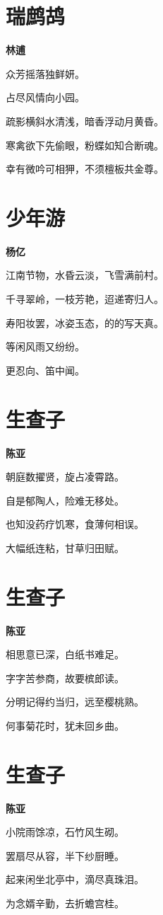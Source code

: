 \documentclass[12pt,a4paper]{ctexbook}
\begin{document}
\section{瑞鹧鸪}
\textbf{林逋}\par\vspace{0.5em}
众芳摇落独鲜妍。\par
占尽风情向小园。\par
疏影横斜水清浅，暗香浮动月黄昏。\par
寒禽欲下先偷眼，粉蝶如知合断魂。\par
幸有微吟可相狎，不须檀板共金尊。\par

\section{少年游}
\textbf{杨亿}\par\vspace{0.5em}
江南节物，水昏云淡，飞雪满前村。\par
千寻翠岭，一枝芳艳，迢递寄归人。\par
寿阳妆罢，冰姿玉态，的的写天真。\par
等闲风雨又纷纷。\par
更忍向、笛中闻。\par

\section{生查子}
\textbf{陈亚}\par\vspace{0.5em}
朝庭数擢贤，旋占凌霄路。\par
自是郁陶人，险难无移处。\par
也知没药疗饥寒，食薄何相误。\par
大幅纸连粘，甘草归田赋。\par

\section{生查子}
\textbf{陈亚}\par\vspace{0.5em}
相思意已深，白纸书难足。\par
字字苦参商，故要槟郎读。\par
分明记得约当归，远至樱桃熟。\par
何事菊花时，犹未回乡曲。\par

\section{生查子}
\textbf{陈亚}\par\vspace{0.5em}
小院雨馀凉，石竹风生砌。\par
罢扇尽从容，半下纱厨睡。\par
起来闲坐北亭中，滴尽真珠泪。\par
为念婿辛勤，去折蟾宫桂。\par
\end{document}

